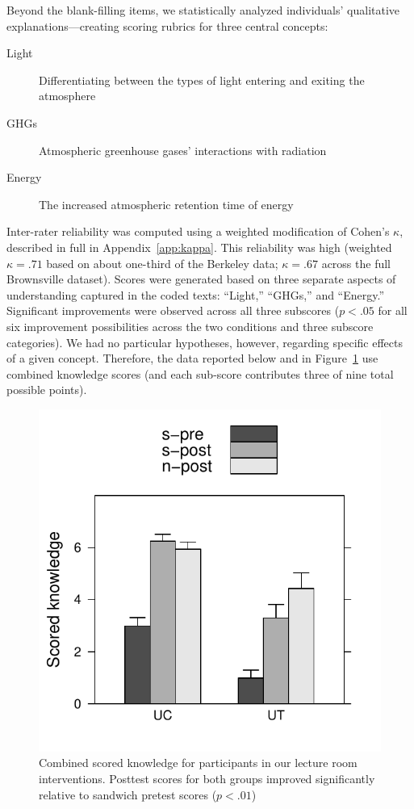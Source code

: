 Beyond the blank-filling items, we statistically analyzed individuals’
qualitative explanations—creating scoring rubrics for three central concepts:
\begin{description} \item[Light] Differentiating between the types of light
        entering and exiting the atmosphere \item[GHGs] Atmospheric greenhouse
        gases’ interactions with radiation \item[Energy] The increased
        atmospheric retention time of energy \end{description} Inter-rater
reliability was computed using a weighted modification of Cohen's $\kappa$,
described in full in Appendix~\ref{app:kappa}. This reliability was high
(weighted $κ = .71$ based on about one-third of the Berkeley data; $κ = .67$
across the full Brownsville dataset). Scores were generated based on three
separate aspects of understanding captured in the coded texts: “Light,” “GHGs,”
and “Energy.” Significant improvements were observed across all three subscores
($p < .05$ for all six improvement possibilities across the two conditions and
three subscore categories). We had no particular hypotheses, however, regarding
specific effects of a given concept. Therefore, the data reported below and in
Figure~\ref{fig:class-scored-knowledge} use combined knowledge scores (and each
sub-score contributes three of nine total possible points).

\begin{figure}
    \centering
    \includegraphics{class-scored-knowledge.pdf}
    \caption{Combined scored knowledge for participants in our lecture room
        interventions. Posttest scores for both groups improved significantly
        relative to sandwich pretest scores ($p < .01$)}
    \label{fig:class-scored-knowledge}
\end{figure}

